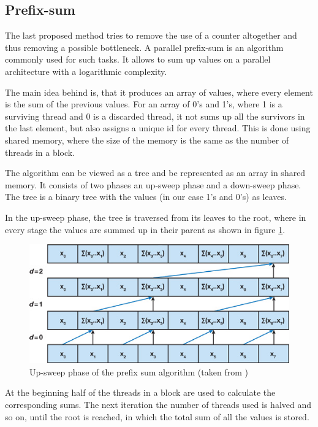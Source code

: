 \subsection{Prefix-sum}\label{sec:impl-prefixsum}

The last proposed method tries to remove the use of a counter altogether and thus removing a possible bottleneck. A parallel prefix-sum is an algorithm commonly used for such tasks. It allows to sum up values on a parallel architecture with a logarithmic complexity.

The main idea behind is, that it produces an array of values, where every element is the sum of the previous values. For an array of 0's and 1's, where 1 is a surviving thread and 0 is a discarded thread, it not sums up all the survivors in the last element, but also assigns a unique id for every thread. This is done using shared memory, where the size of the memory is the same as the number of threads in a block.

The algorithm can be viewed as a tree and be represented as an array in shared memory. It consists of two phases an up-sweep phase and a down-sweep phase. The tree is a binary tree with the values (in our case 1's and 0's) as leaves.

In the up-sweep phase, the tree is traversed from its leaves to the root, where in every stage the values are summed up in their parent as shown in figure \ref{fig:sweepup}.

\begin{center}
\begin{figure}[ht]
	\centering\includegraphics[width=0.6\linewidth]{fig/sweepup.jpg}
	\caption{Up-sweep phase of the prefix sum algorithm (taken from \cite{harris2007parallel})}
	\label{fig:sweepup}
\end{figure}
\end{center}

At the beginning half of the threads in a block are used to calculate the corresponding sums. The next iteration the number of threads used is halved and so on, until the root is reached, in which the total sum of all the values is stored.

